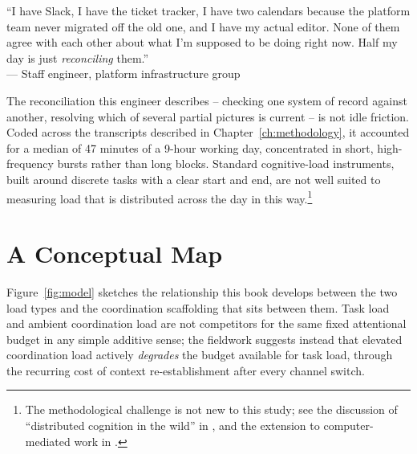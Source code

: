 \begin{fieldexcerpt}[title={Field note, Vertex, week 6}]
``I have Slack, I have the ticket tracker, I have two calendars because the
platform team never migrated off the old one, and I have my actual editor.
None of them agree with each other about what I'm supposed to be doing
right now. Half my day is just \emph{reconciling} them.''\\[2pt]
\hfill--- Staff engineer, platform infrastructure group
\end{fieldexcerpt}

The reconciliation this engineer describes -- checking one system of record
against another, resolving which of several partial pictures is current --
is not idle friction. Coded across the transcripts described in
Chapter~\ref{ch:methodology}, it accounted for a median of 47 minutes of a
9-hour working day, concentrated in short, high-frequency bursts rather than
long blocks. Standard cognitive-load instruments, built around discrete
tasks with a clear start and end, are not well suited to measuring load that
is distributed across the day in this way.\footnote{The methodological
challenge is not new to this study; see the discussion of ``distributed
cognition in the wild'' in \citet{hutchins1995cognition}, and the extension
to computer-mediated work in \citet{hollan2000distributed}.}

\section{A Conceptual Map}

Figure~\ref{fig:model} sketches the relationship this book develops between
the two load types and the coordination scaffolding that sits between them.
Task load and ambient coordination load are not competitors for the same
fixed attentional budget in any simple additive sense; the fieldwork
suggests instead that elevated coordination load actively \emph{degrades}
the budget available for task load, through the recurring cost of context
re-establishment after every channel switch.

